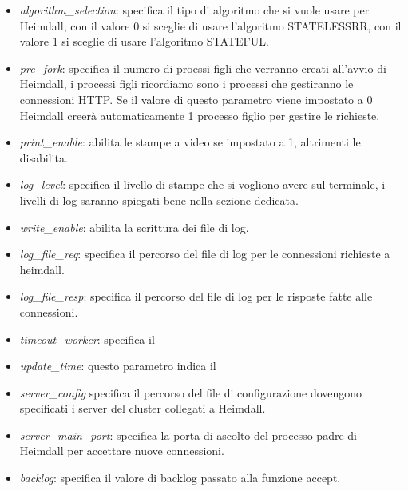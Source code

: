 \documentclass[italian]{tktltiki2}
\begin{document}
\begin{itemize}
	
	\item \emph{algorithm\_selection}: specifica il tipo di algoritmo che si vuole usare per Heimdall, con il valore 0 si sceglie di usare l'algoritmo STATELESSRR, con il valore 1 si sceglie di usare l'algoritmo STATEFUL.
	
	\item \emph{pre\_fork}: specifica il numero di proessi figli che verranno creati all'avvio di Heimdall, i processi figli ricordiamo sono i processi che gestiranno le connessioni HTTP. Se il valore di questo parametro viene impostato a 0 Heimdall creerà automaticamente 1 processo figlio per gestire le richieste.
	
	\item \emph{print\_enable}: abilita le stampe a video se impostato a 1, altrimenti le disabilita.
		
	\item \emph{log\_level}: specifica il livello di stampe che si vogliono avere sul terminale, i livelli di log saranno spiegati bene nella sezione dedicata.
	
	\item \emph{write\_enable}: abilita la scrittura dei file di log.
 	
	\item \emph{log\_file\_req}: specifica il percorso del file di log per le connessioni richieste a heimdall.
		
	\item \emph{log\_file\_resp}: specifica il percorso del file di log per le risposte fatte alle connessioni.
		
	\item \emph{timeout\_worker}: specifica il	
	\item \emph{update\_time}: questo parametro indica il
	
	\item \emph{server\_config} specifica il percorso del file di configurazione dovengono specificati i server del cluster collegati a Heimdall.
	
	\item \emph{server\_main\_port}: specifica la porta di ascolto del processo padre di Heimdall per accettare nuove connessioni.
			
	\item \emph{backlog}: specifica il valore di backlog passato alla funzione accept.
	

\end{itemize}
\end{document}
